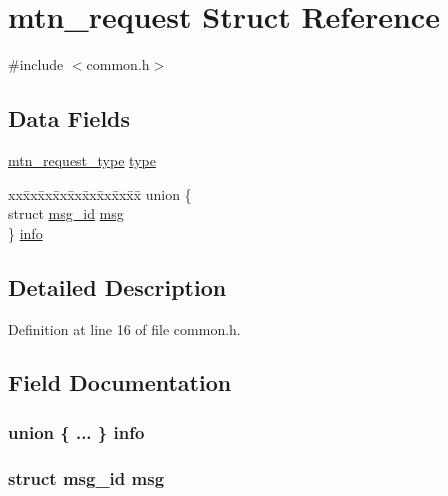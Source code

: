\hypertarget{structmtn__request}{
\section{mtn\_\-request Struct Reference}
\label{structmtn__request}
}


{\ttfamily \#include $<$common.h$>$}

\subsection*{Data Fields}
\begin{DoxyCompactItemize}
\item 
\hyperlink{mtn-protocol_8h_a0428ffebf6e72018c51d0aaad6ad0c34}{mtn\_\-request\_\-type} \hyperlink{structmtn__request_ad81724fd696b045cdceb4c97fdc4eea9}{type}
\item 
\begin{tabbing}
xx\=xx\=xx\=xx\=xx\=xx\=xx\=xx\=xx\=\kill
union \{\\
\>struct \hyperlink{structmsg__id}{msg\_id} \hyperlink{structmtn__request_aa8566a59bdcd7b79a331811ced05cd88}{msg}\\
\} \hyperlink{structmtn__request_aadd9fa0785a11381fd3f9b2fb14865d8}{info}\\

\end{tabbing}\end{DoxyCompactItemize}


\subsection{Detailed Description}


Definition at line 16 of file common.h.



\subsection{Field Documentation}
\hypertarget{structmtn__request_aadd9fa0785a11381fd3f9b2fb14865d8}{
\subsubsection[{info}]{\setlength{\rightskip}{0pt plus 5cm}union \{ ... \}   {\bf info}}}
\label{structmtn__request_aadd9fa0785a11381fd3f9b2fb14865d8}
\hypertarget{structmtn__request_aa8566a59bdcd7b79a331811ced05cd88}{
\subsubsection[{msg}]{\setlength{\rightskip}{0pt plus 5cm}struct {\bf msg\_\-id} {\bf msg}}}
\label{structmtn__request_aa8566a59bdcd7b79a331811ced05cd88}


